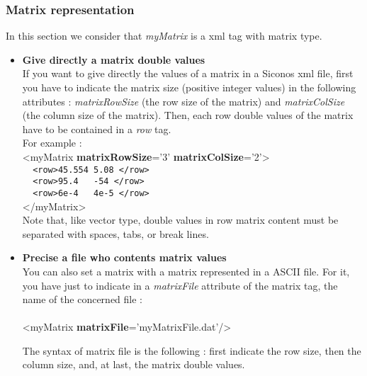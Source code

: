 \subsubsection{Matrix representation}

In this section we consider that \textit{myMatrix} is a \ac{xml} tag with matrix type.\\

\begin{itemize}

\item \textbf{Give directly a matrix double values}\\

If you want to give directly the values of a matrix in a Siconos \ac{xml} file, first you have to indicate the matrix size (positive integer values) in the following attributes : \textit{matrixRowSize} (the row size of the matrix) and
 \textit{matrixColSize} (the column size of the matrix). Then, each row double values of the matrix have to be contained in a \textit{row} tag. \\


For example : \\

<myMatrix \textbf{matrixRowSize}='3' \textbf{matrixColSize}='2'>  \\
\verb+	<row>45.554 5.08 </row>+\\
\verb+	<row>95.4	-54 </row>+\\
\verb+	<row>6e-4	4e-5 </row>+\\
</myMatrix>\\


Note that, like vector type, double values in row matrix content must be separated with spaces, tabs, or break lines.\\


\item \textbf{Precise a file who contents matrix values}\\

You can also set a matrix with a matrix represented in a ASCII file.
For it, you have just to indicate in a \textit{matrixFile} attribute of the matrix tag, the name of the concerned file :\\\\

<myMatrix \textbf{matrixFile}='myMatrixFile.dat'/>

The syntax of matrix file is the following : 
first indicate the row size, then the column size, and, at last, the matrix double values.\\


\end{itemize}
